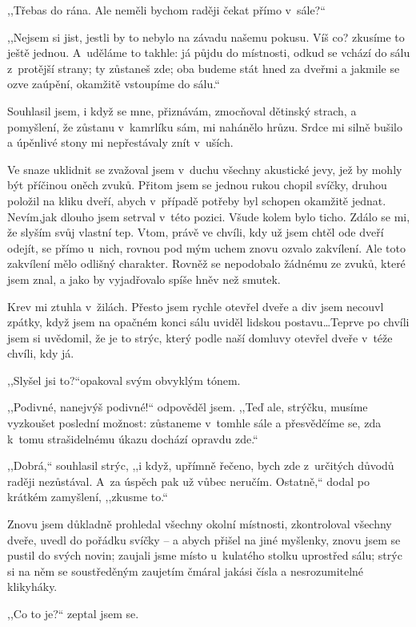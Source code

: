 ,,Třebas do rána. Ale neměli bychom raději čekat přímo v sále?``

,,Nejsem si jist, jestli by to nebylo na závadu našemu pokusu. Víš co? zkusíme to ještě jednou. A~uděláme to takhle: já půjdu do místnosti, odkud se vchází do sálu z protější strany; ty zůstaneš zde; oba budeme stát hned za dveřmi a jakmile se ozve zaúpění, okamžitě vstoupíme do sálu.``

Souhlasil jsem, i když se mne, přiznávám, zmocňoval dětinský strach, a pomyšlení, že zůstanu v kamrlíku sám, mi nahánělo hrůzu. Srdce mi silně bušilo a úpěnlivé stony mi nepřestávaly znít v uších.

Ve snaze uklidnit se zvažoval jsem v duchu všechny akustické jevy, jež by mohly být příčinou oněch zvuků. Přitom jsem se jednou rukou chopil svíčky, druhou položil na kliku dveří, abych v případě potřeby byl schopen okamžitě jednat. Nevím,jak dlouho jsem setrval v této pozici. Všude kolem bylo ticho. Zdálo se mi, že slyším svůj vlastní tep. Vtom, právě ve chvíli, kdy už jsem chtěl ode dveří odejít, se přímo u~nich, rovnou pod mým uchem znovu ozvalo zakvílení. Ale toto zakvílení mělo odlišný charakter. Rovněž se nepodobalo žádnému ze zvuků, které jsem znal, a jako by vyjadřovalo spíše hněv než smutek.

Krev mi ztuhla v žilách. Přesto jsem rychle otevřel dveře a div jsem necouvl zpátky, když jsem na opačném konci sálu uviděl lidskou postavu\ldots Teprve po chvíli jsem si uvědomil, že je to strýc, který podle naší domluvy otevřel dveře v téže chvíli, kdy já.

,,Slyšel jsi to?``opakoval svým obvyklým tónem.

,,Podivné, nanejvýš podivné!`` odpověděl jsem. ,,Teď ale, strýčku, musíme vyzkoušet poslední možnost: zůstaneme v tomhle sále a přesvědčíme se, zda k tomu strašidelnému úkazu dochází opravdu zde.``

,,Dobrá,`` souhlasil strýc, ,,i když, upřímně řečeno, bych zde z určitých důvodů raději nezůstával. A~za úspěch pak už vůbec neručím. Ostatně,`` dodal po krátkém zamyšlení, ,,zkusme to.``

Znovu jsem důkladně prohledal všechny okolní místnosti, zkontroloval všechny dveře, uvedl do pořádku svíčky – a abych přišel na jiné myšlenky, znovu jsem se pustil do svých novin; zaujali jsme místo u~kulatého stolku uprostřed sálu; strýc si na něm se soustředěným zaujetím čmáral jakási čísla a nesrozumitelné klikyháky.

,,Co to je?`` zeptal jsem se.

